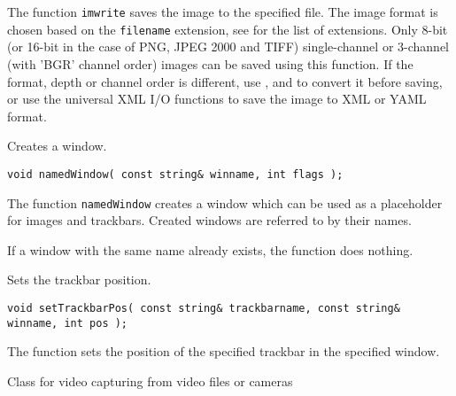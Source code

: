 The function \texttt{imwrite} saves the image to the specified file. The image format is chosen based on the \texttt{filename} extension, see  for the list of extensions. Only 8-bit (or 16-bit in the case of PNG, JPEG 2000 and TIFF) single-channel or 3-channel (with 'BGR' channel order) images can be saved using this function. If the format, depth or channel order is different, use , and  to convert it before saving, or use the universal XML I/O functions to save the image to XML or YAML format.

\label{namedWindow}
Creates a window.

\begin{lstlisting}
void namedWindow( const string& winname, int flags );
\end{lstlisting}
\begin{description}
\end{description}

The function \texttt{namedWindow} creates a window which can be used as a placeholder for images and trackbars. Created windows are referred to by their names.

If a window with the same name already exists, the function does nothing.

\label{setTrackbarPos}
Sets the trackbar position.

\begin{lstlisting}
void setTrackbarPos( const string& trackbarname, const string& winname, int pos );
\end{lstlisting}
\begin{description}
\end{description}

The function sets the position of the specified trackbar in the specified window.


\label{VideoCapture}
Class for video capturing from video files or cameras

